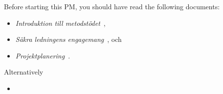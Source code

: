 
Before starting this PM, you should have read the following documents:

\begin{itemize}
  \item \emph{Introduktion till metodstödet}~\cite{MSB2011itm},
  \item \emph{Säkra ledningens engagemang}~\cite{MSB2011sle}, och
  \item \emph{Projektplanering}~\cite{MSB2011p}.
\end{itemize}

Alternatively
\begin{itemize}
  \item \cite[Chapter 3]{iso27000}

\end{itemize}
